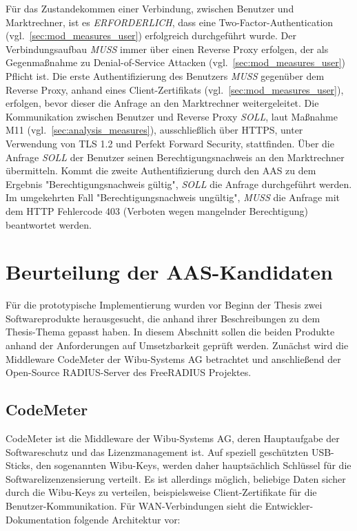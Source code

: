 \documentclass[11pt,a4paper]{report}
\begin{document}
Für das Zustandekommen einer Verbindung, zwischen Benutzer und Marktrechner, ist es \textit{ERFORDERLICH}, dass eine Two-Factor-Authentication (vgl.~\ref{sec:mod_measures_user}) erfolgreich durchgeführt wurde. Der Verbindungsaufbau \textit{MUSS} immer über einen Reverse Proxy erfolgen, der als Gegenmaßnahme zu Denial-of-Service Attacken (vgl.~\ref{sec:mod_measures_user}) Pflicht ist. Die erste Authentifizierung des Benutzers \textit{MUSS} gegenüber dem Reverse Proxy, anhand eines Client-Zertifikats (vgl.~\ref{sec:mod_measures_user}), erfolgen, bevor dieser die Anfrage an den Marktrechner weitergeleitet. Die Kommunikation zwischen Benutzer und Reverse Proxy \textit{SOLL}, laut Maßnahme M11 (vgl.~\ref{sec:analysis_measures}), ausschließlich über HTTPS, unter Verwendung von TLS 1.2 und Perfekt Forward Security, stattfinden. Über die Anfrage \textit{SOLL} der Benutzer seinen Berechtigungsnachweis an den Marktrechner übermitteln. Kommt die zweite Authentifizierung durch den AAS zu dem Ergebnis "Berechtigungsnachweis gültig", \textit{SOLL} die Anfrage durchgeführt werden. Im umgekehrten Fall "Berechtigungsnachweis ungültig", \textit{MUSS} die Anfrage mit dem HTTP Fehlercode 403 (Verboten wegen mangelnder Berechtigung) beantwortet werden.

\section{Beurteilung der AAS-Kandidaten}

Für die prototypische Implementierung wurden vor Beginn der Thesis zwei Softwareprodukte herausgesucht, die anhand ihrer Beschreibungen zu dem Thesis-Thema gepasst haben. In diesem Abschnitt sollen die beiden Produkte anhand der Anforderungen auf Umsetzbarkeit geprüft werden. Zunächst wird die Middleware CodeMeter der Wibu-Systems AG betrachtet und anschließend der Open-Source RADIUS-Server des FreeRADIUS Projektes.

\subsection{CodeMeter}

CodeMeter ist die Middleware der Wibu-Systems AG, deren Hauptaufgabe der Softwareschutz und das Lizenzmanagement ist. Auf speziell geschützten USB-Sticks, den sogenannten Wibu-Keys, werden daher hauptsächlich Schlüssel für die Softwarelizenzensierung verteilt. Es ist allerdings möglich, beliebige Daten sicher durch die Wibu-Keys zu verteilen, beispielsweise Client-Zertifikate für die Benutzer-Kommunikation. Für WAN-Verbindungen sieht die Entwickler-Dokumentation folgende Architektur vor:
\end{document}
